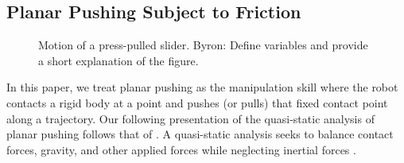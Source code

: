 \documentclass[conference]{IEEEtran}
\newcommand{\BB}[1]{{\color{red} {Byron: {#1}}}}
\begin{document}



\subsection{Planar Pushing Subject to Friction}\label{sec:plan-push-subj}

\begin{figure}[t]
  \centering
  \def\iangle{35} %
  \caption{Motion of a press-pulled slider. \BB{Define variables and provide a short explanation of the figure.}}
  \label{fig:presspull-motion}
\end{figure}

In this paper, we treat planar pushing as the manipulation skill where
the robot contacts a rigid body at a point and pushes (or pulls) that
fixed contact point along a trajectory.
Our following presentation of the quasi-static analysis of planar
pushing follows that of \cite{alexander1993bounds, Mason}. A
quasi-static analysis seeks to balance contact forces, gravity, and
other applied forces while neglecting inertial forces \cite{Mason}.
\end{document}
